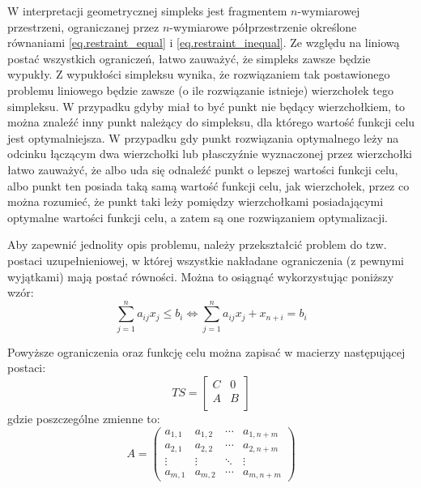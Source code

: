 \documentclass{classrep}
\begin{document}
W interpretacji geometrycznej simpleks jest fragmentem $n$-wymiarowej przestrzeni, ograniczanej przez $n$-wymiarowe półprzestrzenie określone równaniami \ref{eq.restraint_equal} i \ref{eq.restraint_inequal}. Ze względu na liniową postać wszystkich ograniczeń, łatwo zauważyć, że simpleks zawsze będzie wypukły. Z wypukłości simpleksu wynika, że rozwiązaniem tak postawionego problemu liniowego będzie zawsze (o ile rozwiązanie istnieje) wierzchołek tego simpleksu. W przypadku gdyby miał to być punkt nie będący wierzchołkiem, to można znaleźć inny punkt należący do simpleksu, dla którego wartość funkcji celu jest optymalniejsza. W przypadku gdy punkt rozwiązania optymalnego leży na odcinku łączącym dwa wierzchołki lub płasczyźnie wyznaczonej przez wierzchołki łatwo zauważyć, że albo uda się odnaleźć punkt o lepszej wartości funkcji celu, albo punkt ten posiada taką samą wartość funkcji celu, jak wierzchołek, przez co można rozumieć, że punkt taki leży pomiędzy wierzchołkami posiadającymi optymalne wartości funkcji celu, a zatem są one rozwiązaniem optymalizacji.

Aby zapewnić jednolity opis problemu, należy przekształcić problem do tzw. postaci uzupełnieniowej, w której wszystkie nakładane ograniczenia (z pewnymi wyjątkami) mają postać równości. Można to osiągnąć wykorzystując poniższy wzór:
\begin{equation}
  \displaystyle\sum_{j=1}^n a_{ij} x_j \leq b_i \Leftrightarrow \displaystyle\sum_{j=1}^n a_{ij} x_j + x_{n + i} = b_i
\end{equation}

Powyższe ograniczenia oraz funkcję celu można zapisać w macierzy następującej postaci:
\begin{equation}
  TS = \left[ \begin{array}{c|c}
		C & 0 \\
		\hline
		A & B \\
             \end{array}
      \right]
\end{equation}
gdzie poszczególne zmienne to:
\begin{equation}
 A =
 \begin{pmatrix}
  a_{1,1} & a_{1,2} & \cdots & a_{1,n+m} \\
  a_{2,1} & a_{2,2} & \cdots & a_{2,n+m} \\
  \vdots  & \vdots  & \ddots & \vdots  \\
  a_{m,1} & a_{m,2} & \cdots & a_{m,n+m}
 \end{pmatrix}
\end{equation}
\end{document}
